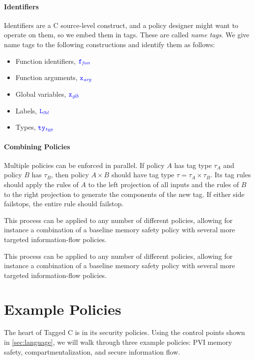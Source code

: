 \documentclass{llncs}
\begin{document}
\begin{table}[t]
\paragraph*{Identifiers}

Identifiers are a C source-level construct, and a policy designer might want to operate on them,
so we embed them in tags. These are called {\em name tags}. We give name tags to the
following constructions and identify them as follows:
\begin{itemize}
\item Function identifiers, \(\mathtt{\color{blue} f}_{\color{blue} \mathit{fun}}\)
\item Function arguments, \(\mathtt{\color{blue} x}_{\color{blue} \mathit{arg}}\)
\item Global variables, \(\mathtt{\color{blue} x}_{\color{blue} \mathit{glb}}\)
\item Labels, \(\mathtt{\color{blue} L}_{\color{blue} \mathit{lbl}}\)
\item Types, \(\mathtt{\color{blue} ty}_{\color{blue} \mathit{typ}}\)
\end{itemize}

\paragraph*{Combining Policies}

Multiple policies can be enforced in parallel. If policy \(A\) has tag type \(\tau_A\)
and policy \(B\) has \(\tau_B\), then policy \(A \times B\) should have tag type
\(\tau = \tau_A \times \tau_B\). Its tag rules should apply the rules of \(A\) to
the left projection of all inputs and the rules of \(B\) to the right projection
to generate the components of the new tag. If either side failstops, the entire
rule should failstop.

This process can be applied to any number of different policies, allowing for instance
a combination of a baseline memory safety policy with several more targeted
information-flow policies.

This process can be applied to any number of different policies, allowing for instance
a combination of a baseline memory safety policy with several more targeted
information-flow policies.

\section{Example Policies}
\label{sec:policies}

The heart of Tagged C is in its security policies.  Using the control points shown in \cref{sec:language},
we will walk through three example policies: PVI memory safety, compartmentalization, and
secure information flow.


\end{table}
\end{document}
